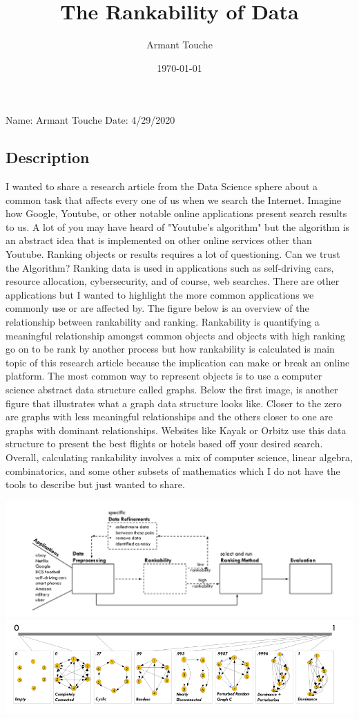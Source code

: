 \documentclass[a4paper,man,biblatex]{apa6}
\title{The Rankability of Data}
\author{Armant Touche}
\affiliation{Portland State University}
\date{\today}
\begin{document}
\thispagestyle{otherpage}
\setcounter{biburllcpenalty}{7000}
\setcounter{biburlucpenalty}{8000}


\noindent Name: Armant Touche\newline
\noindent Date: 4/29/2020

\subsection{Description} I wanted to share a research article from the Data Science sphere about a common task that affects every one of us when we search the Internet. Imagine how Google, Youtube, or other notable online applications present search results to us. A lot of you may have heard of "Youtube's algorithm" but the algorithm is an abstract idea that is implemented on other online services other than Youtube. Ranking objects or results requires a lot of questioning. Can we trust the Algorithm? Ranking data is used in applications such as self-driving cars, resource allocation, cybersecurity, and of course, web searches. There are other applications but I wanted to highlight the more common applications we commonly use or are affected by. The figure below is an overview of the relationship between rankability and ranking. Rankability is quantifying a meaningful relationship amongst common objects and objects with high ranking go on to be rank by another process but how rankability is calculated is main topic of this research article because the implication can make or break an online platform. The most common way to represent objects is to use a computer science abstract data structure called graphs. Below the first image, is another figure that illustrates what a graph data structure looks like. Closer to the zero are graphs with less meaningful relationships and the others closer to one are graphs with dominant relationships. Websites like Kayak or Orbitz use this data structure to present the best flights or hotels based off your desired search. Overall, calculating rankability involves a mix of computer science, linear algebra, combinatorics, and some other subsets of mathematics which I do not have the tools to describe but just wanted to share.


\includegraphics[width=.75\linewidth]{data_pipe}\\
\includegraphics[width=.75\linewidth]{ranking}
\end{document}
